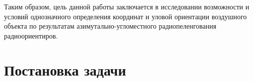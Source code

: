 \documentclass[a4paper,12pt]{article}
\begin{document}
Таким образом, цель данной работы заключается в исследовании возможности и условий однозначного определения
координат и уловой ориентации воздушного объекта по результатам азимутально-угломестного радиопеленгования
радиоориентиров.

\section{Постановка задачи}

\section{}
\end{document}
